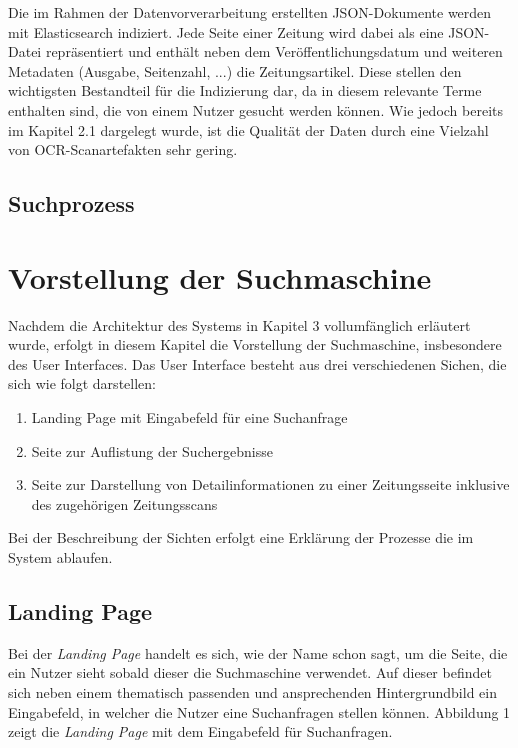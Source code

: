 \documentclass[11pt,a4paper, halfparskip]{scrartcl}
\begin{document}
Die im Rahmen der Datenvorverarbeitung erstellten JSON-Dokumente werden mit Elasticsearch indiziert. 
Jede Seite einer Zeitung wird dabei als eine JSON-Datei repräsentiert und enthält neben dem Veröffentlichungsdatum und weiteren Metadaten (Ausgabe, Seitenzahl, ...) die Zeitungsartikel.
Diese stellen den wichtigsten Bestandteil für die Indizierung dar, da in diesem relevante Terme enthalten sind, die von einem Nutzer gesucht werden können.
Wie jedoch bereits im Kapitel 2.1 dargelegt wurde, ist die Qualität der Daten durch eine Vielzahl von OCR-Scanartefakten sehr gering.

\subsection{Suchprozess}

\section{Vorstellung der Suchmaschine}

Nachdem die Architektur des Systems in Kapitel 3 vollumfänglich erläutert wurde, erfolgt in diesem Kapitel die Vorstellung der Suchmaschine, insbesondere des User Interfaces.
Das User Interface besteht aus drei verschiedenen Sichen, die sich wie folgt darstellen:
	\begin{enumerate}
		\item Landing Page mit Eingabefeld für eine Suchanfrage
		\item Seite zur Auflistung der Suchergebnisse
		\item Seite zur Darstellung von Detailinformationen zu einer Zeitungsseite inklusive des zugehörigen Zeitungsscans  	
	\end{enumerate}
Bei der Beschreibung der Sichten erfolgt eine Erklärung der Prozesse die im System ablaufen.

\subsection{Landing Page}

Bei der \textit{Landing Page} handelt es sich, wie der Name schon sagt, um die Seite, die ein Nutzer sieht sobald dieser die Suchmaschine verwendet.
Auf dieser befindet sich neben einem thematisch passenden und ansprechenden Hintergrundbild ein Eingabefeld, in welcher die Nutzer eine Suchanfragen stellen können. 
Abbildung 1 zeigt die \textit{Landing Page} mit dem Eingabefeld für Suchanfragen.
\end{document}
